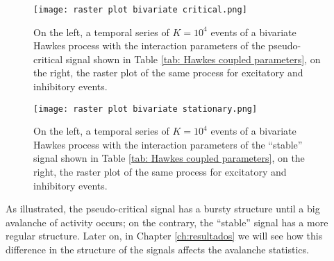 \begin{figure}[H]
    \centering
    \texttt{[image: raster plot bivariate critical.png]}
    \caption{On the left, a temporal series of $K=10^4$ events of a bivariate Hawkes process with the interaction parameters of the pseudo-critical signal shown in Table \ref{tab: Hawkes coupled parameters},
    on the right, the raster plot of the same process for excitatory and inhibitory events.}
    \label{f: Hawkes coupled pseudo}
\end{figure}

\begin{figure}[H]
    \centering
    \texttt{[image: raster plot bivariate stationary.png]}
    \caption{On the left, a temporal series of $K=10^4$ events of a bivariate Hawkes process with the interaction parameters of the ``stable'' signal shown in Table \ref{tab: Hawkes coupled parameters},
    on the right, the raster plot of the same process for excitatory and inhibitory events.}
    \label{f: Hawkes coupled oscilatory}
\end{figure}

As illustrated, the pseudo-critical signal has a bursty structure until a big avalanche of activity occurs; on the contrary, the ``stable'' signal has a more regular structure. Later on,
in Chapter \ref{ch:resultados} we will see how this difference in the structure of the signals affects the avalanche statistics.
